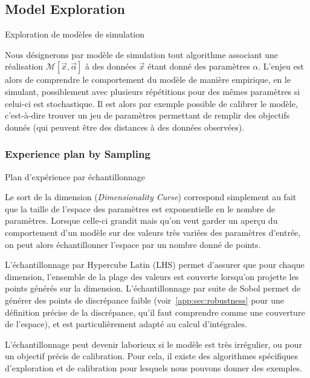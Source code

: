 


\subsection*{Model Exploration}{Exploration de modèles de simulation}

Nous désignerons par modèle de simulation tout algorithme associant une réalisation $\mathcal{M}\left[\vec{x},\vec{\alpha}\right]$ à des données $\vec{x}$ étant donné des paramètres $\alpha$. L'enjeu est alors de comprendre le comportement du modèle de manière empirique, en le simulant, possiblement avec plusieurs répétitions pour des mêmes paramètres si celui-ci est stochastique. Il est alors par exemple possible de calibrer le modèle, c'est-à-dire trouver un jeu de paramètres permettant de remplir des objectifs donnés (qui peuvent être des distances à des données observées).


\subsubsection*{Experience plan by Sampling}{Plan d'expérience par échantillonnage}

Le sort de la dimension (\emph{Dimensionality Curse}) correspond simplement au fait que la taille de l'espace des paramètres est exponentielle en le nombre de paramètres. Lorsque celle-ci grandit mais qu'on veut garder un aperçu du comportement d'un modèle sur des valeurs très variées des paramètres d'entrée, on peut alors échantillonner l'espace par un nombre donné de points.


L'échantillonnage par Hypercube Latin (LHS) permet d'assurer que pour chaque dimension, l'ensemble de la plage des valeurs est couverte lorsqu'on projette les points générés sur la dimension. L'échantillonnage par suite de Sobol permet de générer des points de discrépance faible (voir~\ref{app:sec:robustness} pour une définition précise de la discrépance, qu'il faut comprendre comme une couverture de l'espace), et est particulièrement adapté au calcul d'intégrales.


L'échantillonnage peut devenir laborieux si le modèle est très irrégulier, ou pour un objectif précis de calibration. Pour cela, il existe des algorithmes spécifiques d'exploration et de calibration pour lesquels nous pouvons donner des exemples.

